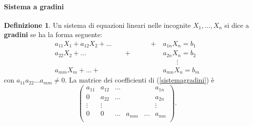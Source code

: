 \documentclass{article}
\theoremstyle{plain}
\theoremstyle{definition}
\newtheorem{defn}{Definizione}[section]
\theoremstyle{remark}
\begin{document}
\paragraph{Sistema a gradini}
\begin{bxthm}
\begin{defn}
    Un sistema di equazioni lineari nelle incognite \( X_1, \ldots, X_n \) si dice a \textbf{gradini} se ha la forma seguente:
    \begin{equation}
        \begin{aligned}
            a_{11}X_1 + a_{12}X_2 + \ldots\;\quad\,\quad\quad\quad\quad + &a_{1n}X_n = b_1 \\
            a_{22}X_2 + \ldots\quad\;\quad\quad\quad\,\quad + &a_{2n}X_n = b_2 \\
            &\quad\quad\vdots \\
            a_{mm}X_m + \ldots + &a_{mn}X_n = b_m
        \end{aligned}\label{sistemagradini}
    \end{equation}
    con \( a_{11}a_{22} \ldots a_{mm} \neq 0 \). 
    La matrice dei coefficienti di (\ref{sistemagradini}) è
    \[
        \begin{pmatrix}
            a_{11}&a_{12}&\dots&&&a_{1n}\\
            0&a_{22}&\dots&&&a_{2n}\\
            \vdots&\vdots&&&&\vdots\\
            0&0&\dots&a_{mm}&\dots&a_{mn}\\
        \end{pmatrix}.
    \]
\end{defn}
\end{bxthm}

\vspace{10pt}
\end{document}
